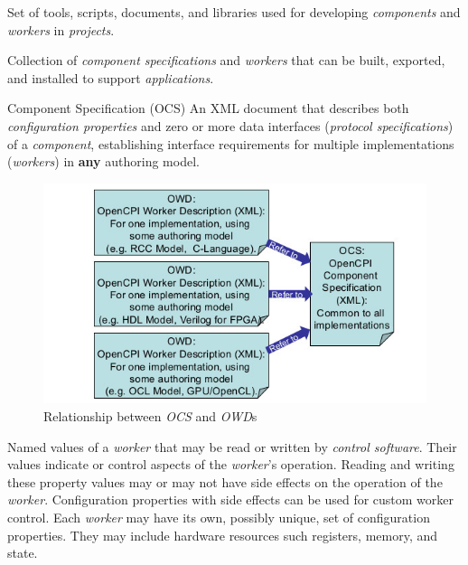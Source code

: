 \begin{description}[style=nextline]
\item[Component Development Kit]
Set of tools, scripts, documents, and libraries used for developing \textit{components} and \textit{workers} in \textit{projects}.

\item[Component Library]
Collection of \textit{component specifications} and \textit{workers} that can be built, exported, and installed to support \textit{applications}.

\begin{minipage}{\textwidth}
\item[Component Specification (OCS)]
An XML document that describes both \textit{configuration properties} and zero or more data interfaces (\textit{protocol specifications}) of a \textit{component}, establishing interface requirements for multiple implementations (\textit{workers}) in \textbf{any} authoring model.
\begin{figure}[H]
\begin{center}
\includegraphics{./figures/owdtoocs.jpg}
\caption{Relationship between \textit{OCS} and \textit{OWD}s}
\label{fig:relations}
\end{center}
\end{figure}
\end{minipage}

\item[Configuration Properties]
Named values of a \textit{worker} that may be read or written by \textit{control software}. Their values indicate or control aspects of the \textit{worker}'s operation. Reading and writing these property values may or may not have side effects on the operation of the \textit{worker}. Configuration properties with side effects can be used for custom worker control. Each \textit{worker} may have its own, possibly unique, set of configuration properties. They may include hardware resources such registers, memory, and state.


\end{description}
